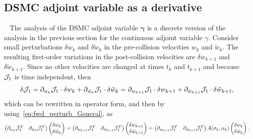 \documentclass[times,final,nopreprintline]{elsarticle}
\newcommand{\bgamma}{\boldsymbol \gamma}
\begin{document}








\subsection{DSMC adjoint variable as a derivative}~\label{sec:DSMC_property}
The analysis of the DSMC adjoint variable $\bgamma$ is a discrete version of the analysis in the previous section for the continuous adjoint variable $\gamma$. Consider  small perturbations $\delta w_k$ and $\delta \tilde w_k$ in the pre-collision velocities $w_k$ and $\tilde w_k$. The resulting first-order variations in the post-collision velocities are $\delta w_{k+1}$ and $\delta \tilde w_{k+1}$. Since no other velocities are changed at times $t_k$ and $t_{k+1}$ and because $\mathcal J_1$ is time independent, then
\begin{equation*} %
    \delta \cJ_1 = \partial_{w_k} \cJ_1 \cdot \delta w_k + \partial_{\tilde w_k} \cJ_1  \cdot \delta \tilde w_k = \partial_{w_{k+1}} \cJ_1 \cdot \delta w_{k+1} + \partial_{\tilde w_{k+1}} \cJ_1 \cdot \delta\tilde w_{k+1},
\end{equation*}
which can be rewritten in operator form, and then by using~\eqref{eq:fwd_perturb_General}, as
\begin{equation*} %
        \begin{pmatrix}
   \partial_{w_k} \cJ_1 ^T &
    \partial_{\tilde w_k} \cJ_1 ^T
    \end{pmatrix}  
         \begin{pmatrix}
   \delta{w_k} \\
    \delta{\tilde w_k}  
    \end{pmatrix}  
    \nonumber 
   =
        \begin{pmatrix}
   \partial_{w_{k+1}} \cJ_1 ^T &
    \partial_{\tilde w_{k+1}} \cJ_1 ^T
    \end{pmatrix}  
         \begin{pmatrix}
   \delta{w_{k+1}} \\
    \delta{\tilde w_{k+1}}  
    \end{pmatrix}  
     =
        \begin{pmatrix}
   \partial_{w_{k+1}} \cJ_1 ^T &
    \partial_{\tilde w_{k+1}} \cJ_1 ^T
    \end{pmatrix}  
   A(\sigma_k,\alpha_k) 
         \begin{pmatrix}
   \delta{w_k} \\
    \delta{\tilde w_k}  
    \end{pmatrix}  .
    \end{equation*}
\end{document}
